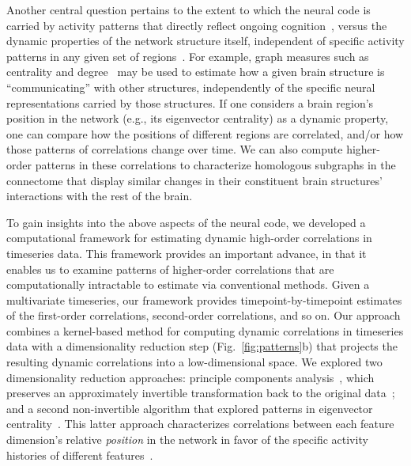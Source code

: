 \documentclass[english]{article}
\providecommand{\DIFaddend}{} %
\DeclareRobustCommand{\DIFaddend}{\DIFOaddend \let\includegraphics\DIFOincludegraphics} %
\begin{document}
\DIFaddend Another central question pertains to the extent to which the neural
code is carried by activity patterns that directly reflect ongoing
cognition~\citep[e.g., following][]{HaxbEtal01, NormEtal06}, versus
the dynamic properties of the network structure itself, independent of
specific activity patterns in any given set of regions~\citep[e.g.,
following][]{BassEtal06}.  For example, graph measures such as
centrality and degree~\citep{BullSpor09} may be used to estimate how a
given brain structure is ``communicating'' with other structures,
independently of the specific neural representations carried by those
structures.  If one considers a brain region's position in the network
(e.g., its eigenvector centrality) as a dynamic property, one can
compare how the positions of different regions are correlated, and/or
how those patterns of correlations change over time.  We can also
compute higher-order patterns in these correlations to characterize
homologous subgraphs in the connectome that display similar changes in
their constituent brain structures' interactions with the rest of the
brain.

To gain insights into the above aspects of the neural code, we
developed a computational framework for estimating dynamic high-order
correlations in timeseries data. This framework provides an important
advance, in that it enables us to examine patterns of higher-order
correlations that are computationally intractable to estimate via
conventional methods.  Given a multivariate timeseries, our framework
provides timepoint-by-timepoint estimates of the first-order
correlations, second-order correlations, and so on.  Our approach
combines a kernel-based method for computing dynamic correlations in
timeseries data with a dimensionality reduction step
(Fig.~\ref{fig:patterns}b) that projects the resulting dynamic
correlations into a low-dimensional space.  We explored two
dimensionality reduction approaches: principle components
analysis~\citep[PCA;][]{Pear01}, which preserves an approximately
invertible transformation back to the original data~\citep[e.g., this
follows related approaches taken by][]{McInJirs19, TokeSomm19,
  GonzEtal19}; and a second non-invertible algorithm that explored
patterns in eigenvector centrality~\citep{Land95}.  This latter
approach characterizes correlations between each feature dimension's
relative \textit{position} in the network in favor of the specific
activity histories of different features~\citep[also
see][]{BetzEtal19, SizeEtal18, ReimEtal17}.
\end{document}
